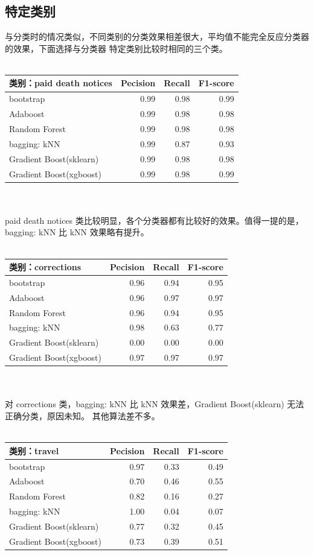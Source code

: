 \documentclass[12pt]{article}
\begin{document}
\subsection{特定类别}
与分类时的情况类似，不同类别的分类效果相差很大，平均值不能完全反应分类器的效果，下面选择与分类器
特定类别比较时相同的三个类。
\\
\\
\begin{tabular}{l|r|r|r}
  \hline
  类别：\textbf{paid death notices} &Pecision&Recall&F1-score\\
  \hline
  bootstrap& 0.99&0.98&0.99\\
  \hline
  Adaboost&0.99&0.98&0.98\\
  \hline
  Random Forest&0.99&0.98&0.98\\
  \hline
  bagging: kNN&0.99&0.87&0.93\\
  \hline
  Gradient Boost(sklearn)&0.99&0.98&0.98\\
  \hline
  Gradient Boost(xgboost)&0.99&0.98&0.99\\
  \hline
\end{tabular}
\\
\\
paid death notices 类比较明显，各个分类器都有比较好的效果。值得一提的是，bagging: kNN 比 kNN
效果略有提升。\\
\\
\begin{tabular}{l|r|r|r}
  \hline
  类别：\textbf{corrections} &Pecision&Recall&F1-score\\
  \hline
  bootstrap& 0.96&0.94&0.95\\
  \hline
  Adaboost&0.96&0.97&0.97\\
  \hline
  Random Forest& 0.96&0.94&0.95\\
  \hline
  bagging: kNN&0.98&0.63&0.77\\
  \hline
  Gradient Boost(sklearn)&0.00&0.00&0.00\\
  \hline
  Gradient Boost(xgboost)&0.97&0.97&0.97\\
  \hline
\end{tabular}
\\
\\
对 corrections 类，bagging: kNN 比 kNN 效果差，Gradient Boost(sklearn) 无法正确分类，原因未知。
其他算法差不多。
\\
\\
\begin{tabular}{l|r|r|r}
  \hline
  类别：\textbf{travel} &Pecision&Recall&F1-score\\
  \hline
  bootstrap& 0.97&0.33&0.49\\
  \hline
  Adaboost&0.70&0.46&0.55\\
  \hline
  Random Forest&0.82&0.16&0.27\\
  \hline
  bagging: kNN&1.00&0.04&0.07\\
  \hline
  Gradient Boost(sklearn)&0.77&0.32&0.45\\
  \hline
  Gradient Boost(xgboost)&0.73&0.39&0.51\\
  \hline
\end{tabular}
\end{document}
